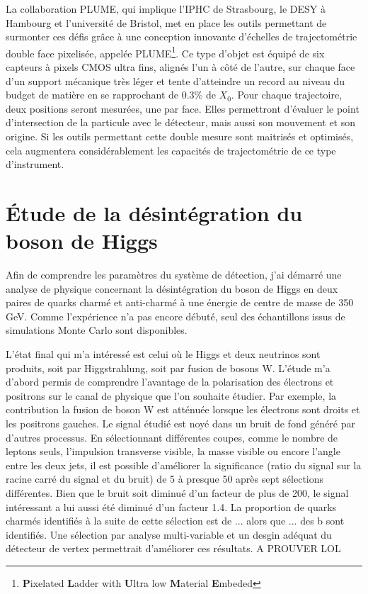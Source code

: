 \documentclass[a4papper, 10pt]{article}
\begin{document}
  La collaboration PLUME, qui implique l'IPHC de Strasbourg, le DESY à Hambourg et l'université de Bristol, met en place les outils permettant de surmonter ces défis grâce à une conception innovante d'échelles de trajectométrie double face pixelisée, appelée PLUME\footnote{\textbf{P}ixelated \textbf{L}adder with \textbf{U}ltra low \textbf{M}aterial \textbf{E}mbeded}. 
  Ce type d'objet est équipé de six capteurs à pixels CMOS ultra fins, alignés l'un à côté de l'autre, sur chaque face d'un support mécanique très léger et tente d'atteindre un record au niveau du budget de matière en se rapprochant de 0.3\% de $X_0$.
  Pour chaque trajectoire, deux positions seront mesurées, une par face. 
  Elles permettront d'évaluer le point d'intersection de la particule avec le détecteur, mais aussi son mouvement et son origine. 
  Si les outils permettant cette double mesure sont maitrisés et optimisés, cela augmentera considérablement les capacités de trajectométrie de ce type d'instrument.

  \section{Étude de la désintégration du boson de Higgs}

  Afin de comprendre les paramètres du système de détection, j'ai démarré une analyse de physique concernant la désintégration du boson de Higgs en deux paires de quarks charmé et anti-charmé à une énergie de centre de masse de 350 GeV.
  Comme l'expérience n'a pas encore débuté, seul des échantillons issus de simulations Monte Carlo sont disponibles.

  L'état final qui m'a intéressé est celui où le Higgs et deux neutrinos sont produits, soit par Higgstrahlung, soit par fusion de bosons W.
  L'étude m'a d'abord permis de comprendre l'avantage de la polarisation des électrons et positrons sur le canal de physique que l'on souhaite étudier.
  Par exemple, la contribution la fusion de boson W est atténuée lorsque les électrons sont droits et les positrons gauches.
  Le signal étudié est noyé dans un bruit de fond généré par d'autres processus. 
  En sélectionnant différentes coupes, comme le nombre de leptons seuls, l'impulsion transverse visible, la masse visible ou encore l'angle entre les deux jets, il est possible d'améliorer la significance (ratio du signal sur la racine carré du signal et du bruit) de 5 à presque 50 après sept sélections différentes. 
  Bien que le bruit soit diminué d'un facteur de plus de 200, le signal intéressant a lui aussi été diminué d'un facteur 1.4.
  La proportion de quarks charmés identifiés à la suite de cette sélection est de ... alors que ... des b sont identifiés. 
  Une sélection par analyse multi-variable et un desgin adéquat du détecteur de vertex permettrait d'améliorer ces résultats. A PROUVER LOL
\end{document}

